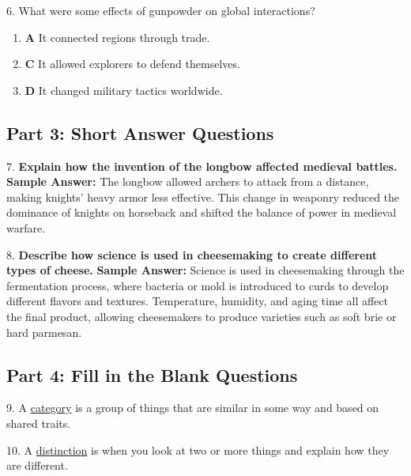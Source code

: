 \documentclass[12pt]{article}
\begin{document}
6. What were some effects of gunpowder on global interactions?
\begin{enumerate}[label=\Alph*.]
    \item \textbf{A} It connected regions through trade.
    \item \textbf{C} It allowed explorers to defend themselves.
    \item \textbf{D} It changed military tactics worldwide.
\end{enumerate}

\subsection*{Part 3: Short Answer Questions}

7. \textbf{Explain how the invention of the longbow affected medieval battles.}
\textbf{Sample Answer:} The longbow allowed archers to attack from a distance, making knights’ heavy armor less effective. This change in weaponry reduced the dominance of knights on horseback and shifted the balance of power in medieval warfare.

8. \textbf{Describe how science is used in cheesemaking to create different types of cheese.}
\textbf{Sample Answer:} Science is used in cheesemaking through the fermentation process, where bacteria or mold is introduced to curds to develop different flavors and textures. Temperature, humidity, and aging time all affect the final product, allowing cheesemakers to produce varieties such as soft brie or hard parmesan.

\subsection*{Part 4: Fill in the Blank Questions}

9. A \underline{category} is a group of things that are similar in some way and based on shared traits.

10. A \underline{distinction} is when you look at two or more things and explain how they are different.
\end{document}

